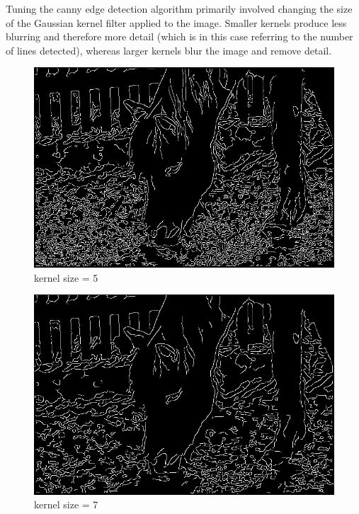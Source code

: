 \documentclass[11pt]{article}
\begin{document}
Tuning the canny edge detection algorithm primarily involved changing the size of the Gaussian kernel filter applied to the image.
Smaller kernels produce less blurring and therefore more detail (which is in this case referring to the number of lines detected),
whereas larger kernels blur the image and remove detail.

\begin{figure}
  \includegraphics[width=\linewidth]{figures/white_horse_ksize=5.jpg}
  \caption{kernel size = 5}
\end{figure}

\begin{figure}
  \includegraphics[width=\linewidth]{figures/white_horse_ksize=7.jpg}
  \caption{kernel size = 7}
\end{figure}
\end{document}
